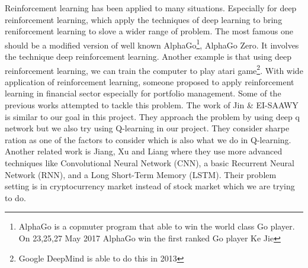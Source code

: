 Reinforcement learning has been applied to many situations.
Especially for deep reinforcement learning, which apply the techniques of deep learning to bring reniforcement learning to slove a wider range of problem.\cite{arulkumaran2017brief} The most famous one should be a modified version of well known AlphaGo\footnote{AlphaGo is a copmuter program that able to win the world class Go player. On 23,25,27 May 2017 AlphaGo win the first ranked Go player Ke Jie}, AlphaGo Zero. It involves the technique deep reinforcement learning. Another example is that using deep reinforcement learning, we can train the computer to play atari game\footnote{Google DeepMind is able to do this in 2013}.\cite{Playing} With wide application of reinforcement learning, someone proposed to apply reinforcement learning in financial sector especially for portfolio management. Some of the previous works attempted to tackle this problem. The work of Jin \& EI-SAAWY \cite{jinportfolio} is similar to our goal in this project. They approach the problem by using deep q network but we also try using Q-learning in our project. They consider sharpe ration as one of the factors to consider  which is also what we do in Q-learning. Another related work is Jiang, Xu and Liang\cite{du2009algorithm} where they use more advanced techniques like Convolutional Neural Network (CNN), a basic Recurrent Neural Network (RNN), and a Long Short-Term Memory (LSTM). Their problem setting is in cryptocurrency market instead of stock market which we are trying to do.
